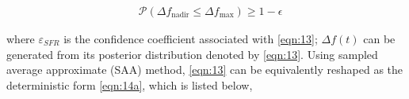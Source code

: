 \documentclass[lettersize,journal]{IEEEtran}
\begin{document}
\vspace{-0.125in} 
\begin{small} 
	     \begin{align}\label{eqn:15} 
			          & \mathcal{P}\left(\varDelta f_{\text{nadir}} \leq \varDelta f_{\text{max}}\right) \geq 1-\epsilon 
		\end{align}
\end{small}

\noindent where $\varepsilon_{SFR}$ is the confidence coefficient associated with \eqref{eqn:13}; \(\varDelta f(t)\) can be generated from its posterior distribution denoted by \eqref{eqn:13}. Using
sampled average approximate (SAA) method, \cref{eqn:13} can be equivalently reshaped as the deterministic form \eqref{eqn:14a}, which is listed below,


\end{document}

